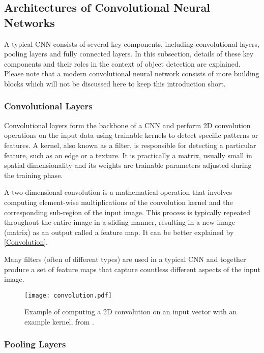 \subsection{Architectures of Convolutional Neural Networks}

A typical CNN consists of several key components, including convolutional
layers, pooling layers and fully connected layers. In this subsection, details
of these key components and their roles in the context of object detection are
explained. Please note that a modern convolutional neural network consists of
more building blocks which will not be discussed here to keep this introduction
short.

\subsubsection{Convolutional Layers}

Convolutional layers form the backbone of a CNN and perform 2D convolution
operations on the input data using trainable kernels to detect specific patterns
or features. A kernel, also known as a filter, is responsible for detecting a
particular feature, such as an edge or a texture. It is practically a matrix,
usually small in spatial dimensionality and its weights are trainable parameters
adjusted during the training phase. \cite{OShea2015}

A two-dimensional convolution is a mathematical operation that involves
computing element-wise multiplications of the convolution kernel and the
corresponding sub-region of the input image. This process is typically repeated
throughout the entire image in a sliding manner, resulting in a new image
(matrix) as an output called a feature map. It can be better explained by
\autoref{Convolution}.

Many filters (often of different types) are used in a typical CNN and together
produce a set of feature maps that capture countless different aspects of the
input image.

\begin{figure}[h]
    \centering
    \texttt{[image: convolution.pdf]}
    \caption{Example of computing a 2D convolution on an input vector with an example kernel, from \cite{OShea2015}.}
    \label{Convolution}
\end{figure}


\subsubsection{Pooling Layers}

